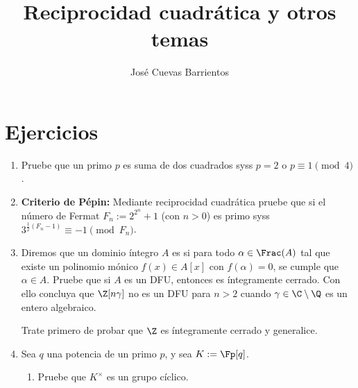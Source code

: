 \documentclass[11pt, reqno]{amsart}
\title{Reciprocidad cuadrática y otros temas}
\date{\DTMdate{2025-08-22}}
\author[José Cuevas]{José Cuevas Barrientos}
\begin{document}
\maketitle

\section{Ejercicios}
\begin{enumerate}
	\item Pruebe que un primo $p$ es suma de dos cuadrados syss $p = 2$ o $p \equiv 1 \pmod 4$.

	\item \textbf{Criterio de Pépin:}
		Mediante reciprocidad cuadrática pruebe que si el número de Fermat $F_n := 2^{2^n} + 1$ (con $n > 0$) es primo syss
		$3^{\frac{1}{2}(F_n - 1)} \equiv -1 \pmod{F_n}$.
		\nocite{granville:masterclass}

		\begin{comment}
			\lookup
			El interés detrás de este criterio es que es computacionalmente rápido calcular potencias módulo un número.
			A mano, puede emplear el criterio de Pépin para confirmar que $F_5 = 4\, 294\, 967\, 297$ no es primo (hallazgo de
			L.~Euler) y, si lo implementa en un lenguaje como \texttt{Python}, \texttt{Sage} u otro, puede verificar que $F_5, \dots,
			F_{10}$ son todos compuestos sin problema.
			(Si, por el contrario, trata de buscar sus factores primos, dará cuenta que son bastante altos, por lo que el criterio es
			bastante más eficaz.)
		\end{comment}

	\item Diremos que un dominio íntegro $A$ es  si para todo $\alpha \in \Frac(A)$ tal que existe un
		polinomio mónico $f(x) \in A[x]$ con $f(\alpha) = 0$, se cumple que $\alpha \in A$.
		Pruebe que si $A$ es un DFU, entonces es íntegramente cerrado.
		Con ello concluya que $\Z[n \gamma]$ no es un DFU para $n > 2$ cuando $\gamma \in \C \setminus \Q$ es un entero algebraico.

		\begin{hint}
			Trate primero de probar que $\Z$ es íntegramente cerrado y generalice.
		\end{hint}

	\item Sea $q$ una potencia de un primo $p$, y sea $K := \Fp[q]$.
		\begin{enumerate}
			\item Pruebe que $K^\times$ es un grupo cíclico.


\end{enumerate}
\end{enumerate}
\end{document}
